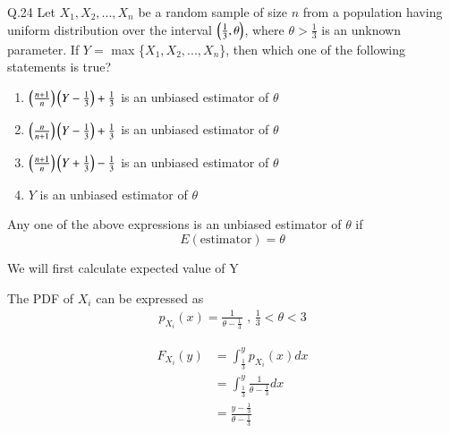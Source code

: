 \documentclass{article}[]
\begin{document}
	\newcommand*{\permcomb}[4][0mu]{{{}^{#3}\mkern#1#2_{#4}}}
\newcommand*{\perm}[1][-3mu]{\permcomb[#1]{P}}
\newcommand*{\comb}[1][-1mu]{\permcomb[#1]{C}}
\providecommand{\qfunc}[1]{\ensuremath{Q\left(#1\right)}}
\providecommand{\gauss}[2]{\mathcal{N}\ensuremath{\left(#1,#2\right)}}
\providecommand{\diff}[2]{\ensuremath{\frac{d{#1}}{d{#2}}}}
\providecommand{\myceil}[1]{\left \lceil #1 \right \rceil }
\newcommand\figref{Fig.~\ref}
\newcommand\tabref{Table~\ref}
\newcommand{\sinc}{\,\text{sinc}\,}
\newcommand{\rect}{\,\text{rect}\,}

\let\vec\mathbf

Q.24 Let $X_1, X_2,...,X_n$ be a random sample of size $n$ from a population having uniform distribution over the interval $\left(\frac{1}{3},\theta\right)$, where $\theta>\frac{1}{3}$ is an unknown parameter. If $Y = $ max \{$X_1, X_2,...,X_n$\}, then which one of the following statements is true?
\begin{enumerate}
\item $\left(\frac{n+1}{n}\right)\left(Y-\frac{1}{3}\right) + \frac{1}{3}$ is an unbiased estimator of $\theta$
\item $\left(\frac{n}{n+1}\right)\left(Y-\frac{1}{3}\right) + \frac{1}{3}$ is an unbiased estimator of $\theta$
\item $\left(\frac{n+1}{n}\right)\left(Y+\frac{1}{3}\right) - \frac{1}{3}$ is an unbiased estimator of $\theta$
\item $Y$ is an unbiased estimator of $\theta$
\end{enumerate} 
\fi
\solution

Any one of the above expressions is an unbiased estimator of $\theta$ if 
$$E(\text{estimator})=\theta$$

We will first calculate expected value of Y

The PDF of $X_i$ can be expressed as
\begin{align}
p_{X_i}(x)=\frac{1}{\theta-\frac{1}{3}} \text{ , }  \frac{1}{3}<\theta<3
\end{align}

\begin{align}
F_{X_i}(y)&=\int_{\frac{1}{3}}^{y} p_{X_i}(x) dx \\
&=\int_{\frac{1}{3}}^{y} \frac{1}{\theta-\frac{1}{3}} dx \\
&=\frac{y-\frac{1}{3}}{\theta-\frac{1}{3}}
\end{align}
\end{document}
